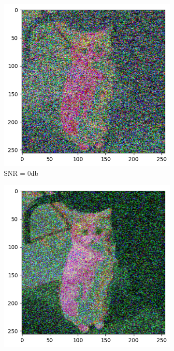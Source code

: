 \begin{figure}[htbp]
    \centering
    \begin{subfigure}[t]{.49\linewidth}
        \includegraphics[width=\linewidth]{../Source/results/output_0db.png}
        \caption{SNR = 0db}
        \label{0db}
    \end{subfigure}
    \hfil
    \begin{subfigure}[t]{0.49\linewidth}
        \includegraphics[width=\linewidth]{../Source/results/output_10db.png}

\end{subfigure}
\end{figure}
